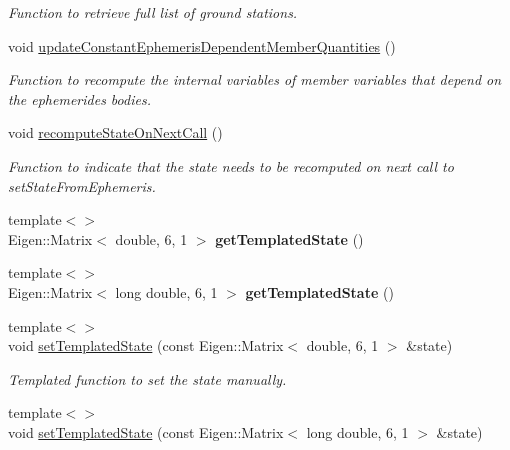 \begin{DoxyCompactItemize}
\begin{DoxyCompactList}\small\item\em Function to retrieve full list of ground stations. \end{DoxyCompactList}\item 
void \hyperlink{classtudat_1_1simulation__setup_1_1Body_a0c2cbfb00a1d2291e8277ac7538536eb}{update\+Constant\+Ephemeris\+Dependent\+Member\+Quantities} ()
\begin{DoxyCompactList}\small\item\em Function to recompute the internal variables of member variables that depend on the ephemerides bodies. \end{DoxyCompactList}\item 
void \hyperlink{classtudat_1_1simulation__setup_1_1Body_a397a8d10e8da91cac860d4978784b963}{recompute\+State\+On\+Next\+Call} ()
\begin{DoxyCompactList}\small\item\em Function to indicate that the state needs to be recomputed on next call to set\+State\+From\+Ephemeris. \end{DoxyCompactList}\item 
{\footnotesize template$<$$>$ }\\Eigen\+::\+Matrix$<$ double, 6, 1 $>$ {\bfseries get\+Templated\+State} ()\hypertarget{classtudat_1_1simulation__setup_1_1Body_a5b104a64818a2097f29cd2d54b185e76}{}\label{classtudat_1_1simulation__setup_1_1Body_a5b104a64818a2097f29cd2d54b185e76}

\item 
{\footnotesize template$<$$>$ }\\Eigen\+::\+Matrix$<$ long double, 6, 1 $>$ {\bfseries get\+Templated\+State} ()\hypertarget{classtudat_1_1simulation__setup_1_1Body_aa0d27be87a92ac3004608d1ecf7b9fd3}{}\label{classtudat_1_1simulation__setup_1_1Body_aa0d27be87a92ac3004608d1ecf7b9fd3}

\item 
{\footnotesize template$<$$>$ }\\void \hyperlink{classtudat_1_1simulation__setup_1_1Body_aa857b1713489c0e596297e579051a1d2}{set\+Templated\+State} (const Eigen\+::\+Matrix$<$ double, 6, 1 $>$ \&state)\hypertarget{classtudat_1_1simulation__setup_1_1Body_aa857b1713489c0e596297e579051a1d2}{}\label{classtudat_1_1simulation__setup_1_1Body_aa857b1713489c0e596297e579051a1d2}

\begin{DoxyCompactList}\small\item\em Templated function to set the state manually. \end{DoxyCompactList}\item 
{\footnotesize template$<$$>$ }\\void \hyperlink{classtudat_1_1simulation__setup_1_1Body_a78d1bb0d438e8e6aff3a1462e0c41222}{set\+Templated\+State} (const Eigen\+::\+Matrix$<$ long double, 6, 1 $>$ \&state)\hypertarget{classtudat_1_1simulation__setup_1_1Body_a78d1bb0d438e8e6aff3a1462e0c41222}{}\label{classtudat_1_1simulation__setup_1_1Body_a78d1bb0d438e8e6aff3a1462e0c41222}


\end{DoxyCompactItemize}
